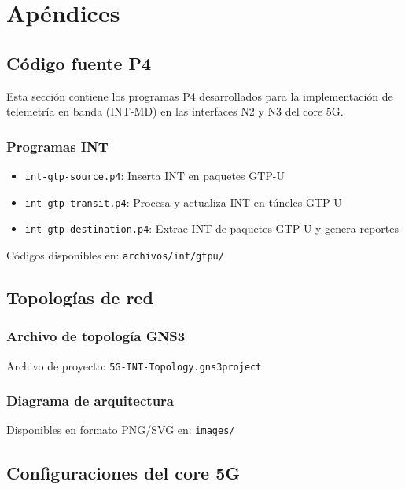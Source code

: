\chapter{Apéndices}

\section{Código fuente P4}
Esta sección contiene los programas P4 desarrollados para la implementación de telemetría en banda (INT-MD) en las interfaces N2 y N3 del core 5G.

\subsection{Programas INT}
\begin{itemize}
    \item \texttt{int-gtp-source.p4}: Inserta INT en paquetes GTP-U
    \item \texttt{int-gtp-transit.p4}: Procesa y actualiza INT en túneles GTP-U
    \item \texttt{int-gtp-destination.p4}: Extrae INT de paquetes GTP-U y genera reportes
\end{itemize}

Códigos disponibles en: \texttt{archivos/int/gtpu/}

\section{Topologías de red}

\subsection{Archivo de topología GNS3}
Archivo de proyecto: \texttt{5G-INT-Topology.gns3project}

\subsection{Diagrama de arquitectura}
Disponibles en formato PNG/SVG en: \texttt{images/}

\section{Configuraciones del core 5G}

